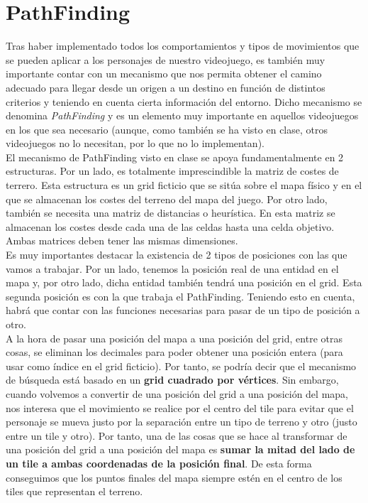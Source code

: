 \medskip
\section{PathFinding}

Tras haber implementado todos los comportamientos y tipos de movimientos que se pueden aplicar a los personajes de nuestro videojuego, es también muy importante contar con un mecanismo que nos permita obtener el camino adecuado para llegar desde un origen a un destino en función de distintos criterios y teniendo en cuenta cierta información del entorno. Dicho mecanismo se denomina \textit{PathFinding} y es un elemento muy importante en aquellos videojuegos en los que sea necesario (aunque, como también se ha visto en clase, otros videojuegos no lo necesitan, por lo que no lo implementan). \\

El mecanismo de PathFinding visto en clase se apoya fundamentalmente en 2 estructuras. Por un lado, es totalmente imprescindible la matriz de costes de terrero. Esta estructura es un grid ficticio que se sitúa sobre el mapa físico y en el que se almacenan los costes del terreno del mapa del juego. Por otro lado, también se necesita una matriz de distancias o heurística. En esta matriz se almacenan los costes desde cada una de las celdas hasta una celda objetivo. Ambas matrices deben tener las mismas dimensiones. \\

Es muy importantes destacar la existencia de 2 tipos de posiciones con las que vamos a trabajar. Por un lado, tenemos la posición real de una entidad en el mapa y, por otro lado, dicha entidad también tendrá una posición en el grid. Esta segunda posición es con la que trabaja el PathFinding. Teniendo esto en cuenta, habrá que contar con las funciones necesarias para pasar de un tipo de posición a otro. \\

A la hora de pasar una posición del mapa a una posición del grid, entre otras cosas, se eliminan los decimales para poder obtener una posición entera (para usar como índice en el grid ficticio). Por tanto, se podría decir que el mecanismo de búsqueda está basado en un \textbf{grid cuadrado por vértices}. Sin embargo, cuando volvemos a convertir de una posición del grid a una posición del mapa, nos interesa que el movimiento se realice por el centro del tile para evitar que el personaje se mueva justo por la separación entre un tipo de terreno y otro (justo entre un tile y otro). Por tanto, una de las cosas que se hace al transformar de una posición del grid a una posición del mapa es \textbf{sumar la mitad del lado de un tile a ambas coordenadas de la posición final}. De esta forma conseguimos que los puntos finales del mapa siempre estén en el centro de los tiles que representan el terreno. \\

